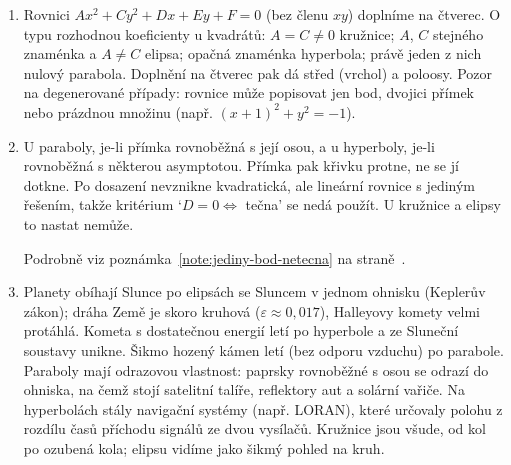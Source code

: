 \begin{enumerate}[label=\textbf{\arabic*.}, leftmargin=*, itemsep=0.8em]
  \item {}
  Rovnici $Ax^2 + Cy^2 + Dx + Ey + F = 0$ (bez členu $xy$) doplníme na čtverec. O typu rozhodnou koeficienty u kvadrátů: $A = C\neq 0$ kružnice; $A$, $C$ stejného znaménka a $A\neq C$ elipsa; opačná znaménka hyperbola; právě jeden z nich nulový parabola. Doplnění na čtverec pak dá střed (vrchol) a poloosy. Pozor na degenerované případy: rovnice může popisovat jen bod, dvojici přímek nebo prázdnou množinu (např. ${(x + 1)}^2 + y^2 = -1$). 

  \item {}
  U paraboly, je-li přímka rovnoběžná s její osou, a u hyperboly, je-li rovnoběžná s některou asymptotou. Přímka pak křivku protne, ne se jí dotkne. Po dosazení nevznikne kvadratická, ale lineární rovnice s jediným řešením, takže kritérium `$D = 0 \Leftrightarrow$ tečna' se nedá použít. U kružnice a elipsy to nastat nemůže.
  \begin{center}
  \end{center}
  Podrobně viz poznámka~\ref{note:jediny-bod-netecna} na straně~\pageref{note:jediny-bod-netecna}.

  \item {}
  Planety obíhají Slunce po elipsách se Sluncem v jednom ohnisku (Keplerův zákon); dráha Země je skoro kruhová ($\varepsilon\approx 0{,}017$), Halleyovy komety velmi protáhlá. Kometa s dostatečnou energií letí po hyperbole a ze Sluneční soustavy unikne. Šikmo hozený kámen letí (bez odporu vzduchu) po parabole. Paraboly mají odrazovou vlastnost: paprsky rovnoběžné s osou se odrazí do ohniska, na čemž stojí satelitní talíře, reflektory aut a solární vařiče. Na hyperbolách stály navigační systémy (např. LORAN), které určovaly polohu z rozdílu časů příchodu signálů ze dvou vysílačů. Kružnice jsou všude, od kol po ozubená kola; elipsu vidíme jako šikmý pohled na kruh.
\end{enumerate}

